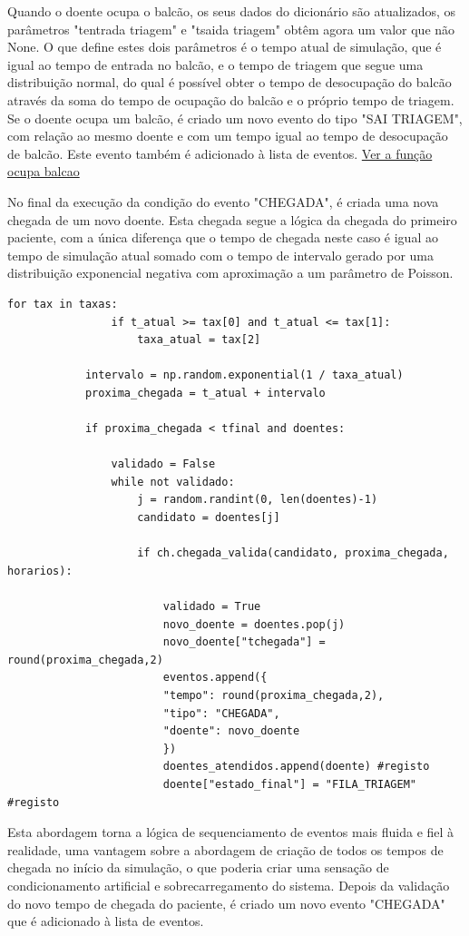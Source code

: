 \documentclass[12pt,a4paper]{article} %
\begin{document}
    Quando o doente ocupa o balcão, os seus dados do dicionário são atualizados, os parâmetros "tentrada triagem" e "tsaida triagem" obtêm agora um valor que não None. O que define estes dois parâmetros é o tempo atual de simulação, que é igual ao tempo de entrada no balcão, e o tempo de triagem  que segue uma distribuição normal, do qual é possível obter o tempo de desocupação do balcão através da soma do tempo de ocupação do balcão e o próprio tempo de triagem. Se o doente ocupa um balcão, é criado um novo evento do tipo "SAI TRIAGEM", com relação ao mesmo doente e com um tempo igual ao tempo de desocupação de balcão. Este evento também é adicionado à lista de eventos. \hyperlink{ocupa_balcao}{Ver a função ocupa balcao}

        \medskip
    No final da execução da condição do evento "CHEGADA", é criada uma nova chegada de um novo doente. Esta chegada segue a lógica da chegada do primeiro paciente, com a única diferença que o tempo de chegada neste caso é igual ao tempo de simulação atual somado com o tempo de intervalo gerado por uma distribuição exponencial negativa com aproximação a um parâmetro de Poisson.
\begin{verbatim}
for tax in taxas:
                if t_atual >= tax[0] and t_atual <= tax[1]:
                    taxa_atual = tax[2]
            
            intervalo = np.random.exponential(1 / taxa_atual)
            proxima_chegada = t_atual + intervalo

            if proxima_chegada < tfinal and doentes:

                validado = False
                while not validado:
                    j = random.randint(0, len(doentes)-1)
                    candidato = doentes[j]

                    if ch.chegada_valida(candidato, proxima_chegada, horarios):

                        validado = True
                        novo_doente = doentes.pop(j)
                        novo_doente["tchegada"] = round(proxima_chegada,2)
                        eventos.append({
                        "tempo": round(proxima_chegada,2),
                        "tipo": "CHEGADA",
                        "doente": novo_doente
                        })
                        doentes_atendidos.append(doente) #registo
                        doente["estado_final"] = "FILA_TRIAGEM" #registo
\end{verbatim}

    \hypertarget{geracao_chegadas}{}
    Esta abordagem torna a lógica de sequenciamento de eventos mais fluida e fiel à realidade, uma vantagem sobre a abordagem de criação de todos os tempos de chegada no início da simulação, o que poderia criar uma sensação de condicionamento artificial e sobrecarregamento do sistema. Depois da validação do novo tempo de chegada do paciente, é criado um novo evento "CHEGADA" que é adicionado à lista de eventos.
\end{document}
